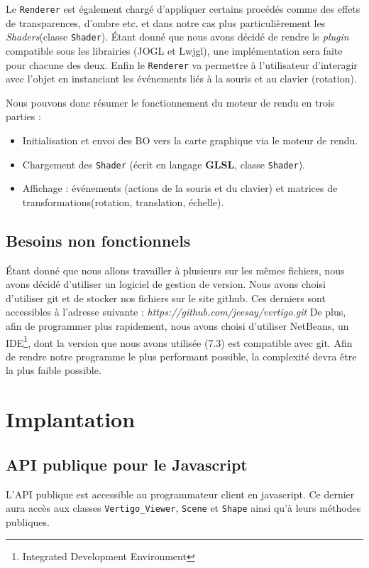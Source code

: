 \documentclass[11pt]{report}
\begin{document}
Le \texttt{Renderer} est également chargé d'appliquer certains procédés comme des effets de transparences, d'ombre etc. et dans notre cas plus particulièrement les \textit{Shaders}(classe \texttt{Shader}).
Étant donné que nous avons décidé de rendre le \textit{plugin} compatible sous les librairies (JOGL et Lwjgl), une implémentation sera faite pour chacune des deux.
Enfin le \texttt{Renderer} va permettre à l'utilisateur d'interagir avec l'objet en instanciant les événements liés à la souris et au clavier (rotation).

Nous pouvons donc résumer le fonctionnement du moteur de rendu en trois parties : %
\begin{itemize}
\item Initialisation et envoi des BO vers la carte graphique via le moteur de rendu.
\item Chargement des \texttt{Shader} (écrit en langage \textbf{GLSL}, classe \texttt{Shader}).
\item Affichage : événements (actions de la souris et du clavier) et matrices de transformations(rotation, translation, échelle).
\end{itemize}

\section{Besoins non fonctionnels}
Étant donné que nous allons travailler à plusieurs sur les mêmes fichiers, nous avons décidé d'utiliser un logiciel de gestion de version. Nous avons choisi d'utiliser git\cite{git} et de stocker nos fichiers sur le site github\cite{github}. Ces derniers sont accessibles à l'adresse suivante : \textit{https://github.com/jeesay/vertigo.git} 
De plus, afin de programmer plus rapidement, nous avons choisi d'utiliser NetBeans\cite{netbeans}, un IDE\footnote{Integrated Development Environment}, dont la version que nous avons utilisée (7.3) est compatible avec git.
Afin de rendre notre programme le plus performant possible, la complexité devra être la plus faible possible. 
\chapter{Implantation} %


\section{API publique pour le Javascript} 
L'API publique est accessible au programmateur client en javascript.
Ce dernier aura accès aux classes \texttt{Vertigo\_Viewer}, \texttt{Scene} et \texttt{Shape}  ainsi qu'à leurs méthodes publiques.
\end{document}

